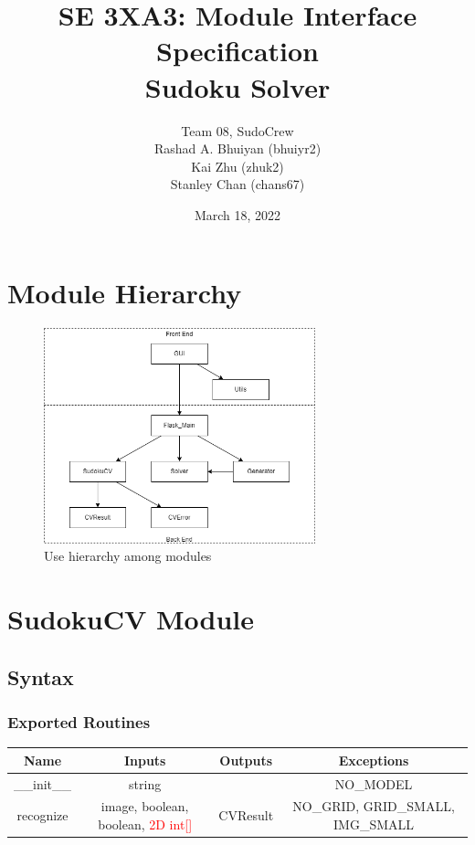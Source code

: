\documentclass[11pt]{article}
\title{SE 3XA3: Module Interface Specification\\Sudoku Solver}
\author{Team 08, SudoCrew
		\\ Rashad A. Bhuiyan (bhuiyr2)
		\\ Kai Zhu (zhuk2)
		\\ Stanley Chan (chans67)
}
\date{March 18, 2022}
\begin{document}
\maketitle
\tableofcontents
\newpage

\section{Module Hierarchy}
\begin{figure}[H]
\centering
\includegraphics[width=0.7\textwidth]{useHierarchy}
\caption{Use hierarchy among modules}
\label{FigUH}
\end{figure}


\section{SudokuCV Module}

		\subsection{Syntax}
		\subsubsection{Exported Routines}
		\begin{tabular}[width=\textwidth, pos]{|c|c|c|c|}
			
			\hline
			\textbf{Name}& \textbf{Inputs} & \textbf{Outputs} & \textbf{Exceptions} \\ \hline
			\_\_init\_\_ & string &  & NO\_MODEL\\ 
			recognize & image, boolean, boolean, \textcolor{red}{2D int[]} & CVResult & NO\_GRID, GRID\_SMALL, IMG\_SMALL\\
			\hline
			
		\end{tabular}
		
\end{document}
